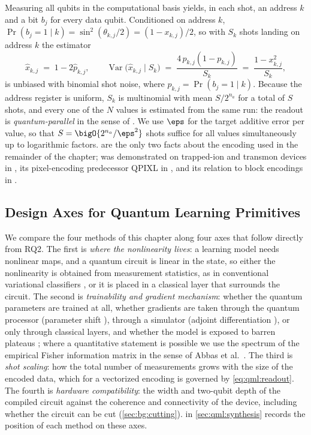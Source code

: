 Measuring all qubits in the computational basis yields, in each shot, an address $k$ and a bit $b_j$ for every data qubit. Conditioned on address $k$, $\Pr(b_j = 1 \mid k) = \sin^2(\theta_{k,j}/2) = (1 - x_{k,j})/2$, so with $S_k$ shots landing on address $k$ the estimator
\begin{equation}\label{eq:qml:readout}
\hat{x}_{k,j} \;=\; 1 - 2\hat{p}_{k,j}, \qquad
\operatorname{Var}\big(\hat{x}_{k,j} \mid S_k\big) \;=\; \frac{4\,p_{k,j}(1-p_{k,j})}{S_k} \;=\; \frac{1 - x_{k,j}^2}{S_k},
\end{equation}
is unbiased with binomial shot noise, where $p_{k,j} = \Pr(b_j = 1 \mid k)$. Because the address register is uniform, $S_k$ is multinomial with mean $S/2^{n_a}$ for a total of $S$ shots, and every one of the $N$ values is estimated from the same run: the readout is \emph{quantum-parallel} in the sense of \cite{balewski2024qcrank}. We use $\eps$ for the target additive error per value, so that $S = \bigO{2^{n_a}/\eps^2}$ shots suffice for all values simultaneously up to logarithmic factors.  are the only two facts about the encoding used in the remainder of the chapter; \qcrank{} was demonstrated on trapped-ion and transmon devices in \cite{balewski2024qcrank}, its pixel-encoding predecessor QPIXL in \cite{amankwah2022qpixl}, and its relation to block encodings in \cite{camps2022fable}.

\subsection{Design Axes for Quantum Learning Primitives}\label{sec:qml:prelim:axes}

We compare the four methods of this chapter along four axes that follow directly from RQ2. The first is \emph{where the nonlinearity lives}: a learning model needs nonlinear maps, and a quantum circuit is linear in the state, so either the nonlinearity is obtained from measurement statistics, as in conventional variational classifiers \cite{schuld2020circuitcentric,perezsalinas2020reuploading}, or it is placed in a classical layer that surrounds the circuit. The second is \emph{trainability and gradient mechanism}: whether the quantum parameters are trained at all, whether gradients are taken through the quantum processor (parameter shift \cite{crooks2019parametershift}), through a simulator (adjoint differentiation \cite{jones2020adjoint}), or only through classical layers, and whether the model is exposed to barren plateaus \cite{mcclean2018barren}; where a quantitative statement is possible we use the spectrum of the empirical Fisher information matrix in the sense of Abbas et al.~\cite{abbas2021powerqnn}. The third is \emph{shot scaling}: how the total number of measurements grows with the size of the encoded data, which for a vectorized encoding is governed by \cref{eq:qml:readout}. The fourth is \emph{hardware compatibility}: the width and two-qubit depth of the compiled circuit against the coherence and connectivity of the device, including whether the circuit can be cut (\cref{sec:bg:cutting}).  in \cref{sec:qml:synthesis} records the position of each method on these axes.

